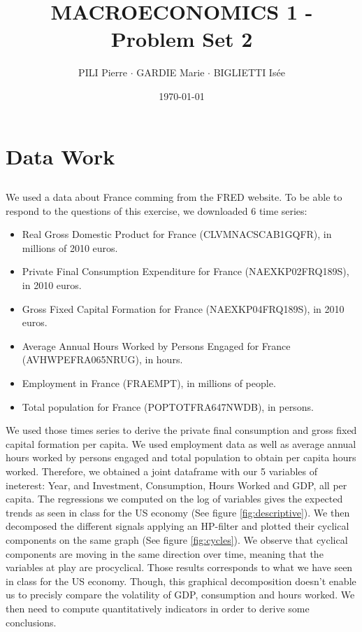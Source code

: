 \documentclass[12pt]{article}
\title{MACROECONOMICS 1 - Problem Set 2}
\author{PILI Pierre $\cdot$ GARDIE Marie $\cdot$ BIGLIETTI Isée}
\date{\today}
\begin{document}
\maketitle
\section{Data Work}
\subsection{}
We used a data about France comming from the FRED website. To be able to respond to the questions of this exercise, we downloaded 6 time series: 
\begin{itemize}
    \item Real Gross Domestic Product for France (CLVMNACSCAB1GQFR), in millions of 2010 euros.
    \item Private Final Consumption Expenditure for France (NAEXKP02FRQ189S), in 2010 euros.
    \item Gross Fixed Capital Formation for France (NAEXKP04FRQ189S), in 2010 euros.
    \item Average Annual Hours Worked by Persons Engaged for France (AVHWPEFRA065NRUG), in hours.
    \item Employment in France (FRAEMPT), in millions of people.
    \item Total population for France (POPTOTFRA647NWDB), in persons.
\end{itemize}
We used those times series to derive the private final consumption and gross fixed capital formation per capita.
We used employment data as well as average annual hours worked by persons engaged and total population to obtain per capita hours worked. 
Therefore, we obtained a joint dataframe with our 5 variables of ineterest: Year, and Investment, Consumption, Hours Worked and GDP, all per capita.
The regressions we computed on the log of variables gives the expected trends as seen in class for the US economy (See figure \ref{fig:descriptive}).
We then decomposed the different signals applying an HP-filter and plotted their cyclical components on the same graph (See figure \ref{fig:cycles}).
We observe that cyclical components are moving in the same direction over time, meaning that the variables at play are procyclical.
Those results corresponds to what we have seen in class for the US economy.
Though, this graphical decomposition doesn't enable us to precisly compare the volatility of GDP, consumption and hours worked. We then need to compute quantitatively indicators in order to derive some conclusions.
\end{document}
